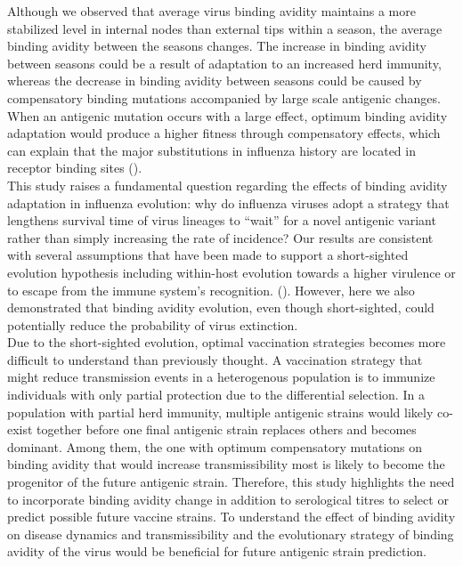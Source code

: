 \documentclass[12pt,a4paper]{article}
\begin{document}
Although we observed that average virus binding avidity maintains a more stabilized level in internal nodes than external tips within a season,  the average binding avidity between the seasons changes. The increase in binding avidity between seasons could be a result of adaptation to an increased herd immunity, whereas the decrease in binding avidity between seasons could be caused by compensatory binding mutations accompanied by large scale antigenic changes. When an antigenic mutation occurs with a large effect, optimum binding avidity adaptation would produce a higher fitness through compensatory effects, which can explain that the major substitutions in influenza history are located in receptor binding sites (\cite{Burke2013}). \\
This study raises a fundamental question regarding the effects of binding avidity adaptation in influenza evolution: why do influenza viruses adopt a strategy that lengthens survival time of virus lineages to “wait” for a novel antigenic variant rather than simply increasing the rate of incidence? Our results are consistent with several assumptions that have been made to support a short-sighted evolution hypothesis including within-host evolution towards a higher virulence or to escape from the immune system’s recognition. (\cite{Levin1994}). However, here we also demonstrated that binding avidity evolution, even though short-sighted, could potentially reduce the probability of virus extinction. \\
Due to the short-sighted evolution, optimal vaccination strategies becomes more difficult to understand than previously thought. A vaccination strategy that might reduce transmission events in a heterogenous population is to immunize  individuals with only partial protection due to the differential selection. In a population with partial herd immunity, multiple antigenic strains would likely co-exist together before one final antigenic strain replaces others and becomes dominant. Among them, the one with optimum compensatory mutations on binding avidity that would increase transmissibility most is likely to become the progenitor of the future antigenic strain. Therefore, this study highlights the need to incorporate binding avidity change in addition to serological titres to select or predict possible future vaccine strains. To understand the effect of binding avidity on disease dynamics and transmissibility and the evolutionary strategy of binding avidity of the virus would be beneficial for future antigenic strain prediction. \\
\clearpage
\end{document}
